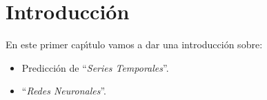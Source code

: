 %
%

\chapter{Introducci\'on}
En este primer cap\'{\i}tulo vamos a dar una introducci\'on sobre:

\begin{itemize}
\item Predicci\'on de ``\emph{Series Temporales}''.
\item ``\emph{Redes Neuronales}''.
\end{itemize}

%
%



%
%



%
%



